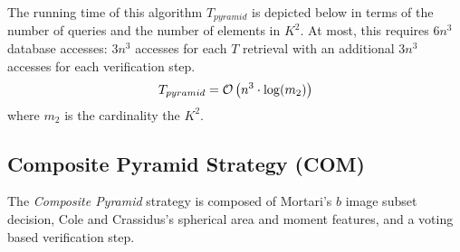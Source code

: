 The running time of this algorithm $T_{pyramid}$ is depicted below in terms of the number of queries and the number
of elements in $K^2$.
At most, this requires $6n^3$ database accesses: $3n^3$ accesses for each $T$ retrieval with an additional
$3n^3$ accesses for each verification step.
\begin{equation}
    T_{pyramid} = \mathcal{O} \left( n^3 \cdot \log( m_2 ) \right)
\end{equation}
where $m_2$ is the cardinality the $K^2$.



\subsection{Composite Pyramid Strategy (COM)}\label{subsec:compositePyramidMethod}
The \textit{Composite Pyramid} strategy is composed of Mortari's $b$ image subset decision, Cole and Crassidus's
spherical area and moment features, and a voting based verification step.

